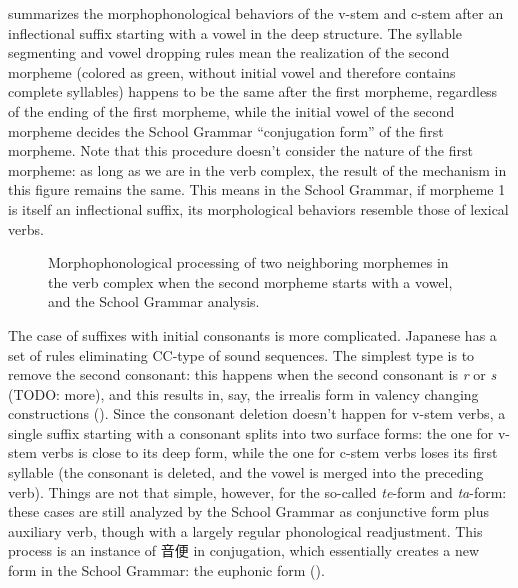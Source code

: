 \documentclass[UTF8, a4paper, oneside, scheme=plain]{ctexart}
\newcommand{\corpus}[1]{\emph{#1}}
\begin{document}
 summarizes the morphophonological behaviors 
of the v-stem and c-stem after an inflectional suffix starting with a vowel in the deep structure.
The syllable segmenting and vowel dropping rules mean the realization of the second morpheme
(colored as green, without initial vowel and therefore contains complete syllables)
happens to be the same after the first morpheme,
regardless of the ending of the first morpheme,
while the initial vowel of the second morpheme
decides the School Grammar ``conjugation form'' of the first morpheme.
Note that this procedure doesn't consider the nature of the first morpheme:
as long as we are in the verb complex,
the result of the mechanism in this figure remains the same.
This means in the School Grammar,
if morpheme 1 is itself an inflectional suffix,
its morphological behaviors resemble those of lexical verbs.

\begin{figure}[H]
    \centering
    
    \caption{Morphophonological processing of two neighboring morphemes in the verb complex
    when the second morpheme starts with a vowel, 
    and the School Grammar analysis.}
    \label{fig:vowel-start-suffix-verb}
\end{figure}

The case of suffixes with initial consonants is more complicated.
Japanese has a set of rules eliminating CC-type of sound sequences.
The simplest type is to remove the second consonant:
this happens when the second consonant is \corpus{r} or \corpus{s} (TODO: more),
and this results in,
say, the irrealis form in valency changing constructions ().
Since the consonant deletion doesn't happen for v-stem verbs,
a single suffix starting with a consonant
splits into two surface forms:
the one for v-stem verbs is close to its deep form,
while the one for c-stem verbs loses its first syllable
(the consonant is deleted, and the vowel is merged into the preceding verb).
Things are not that simple, however, for the so-called \corpus{te}-form and \corpus{ta}-form:
these cases are still analyzed by the School Grammar as 
conjunctive form plus auxiliary verb,
though with a largely regular phonological readjustment.
This process is an instance of 音便 in conjugation,
which essentially creates a new form in the School Grammar:
the euphonic form ().
\end{document}

